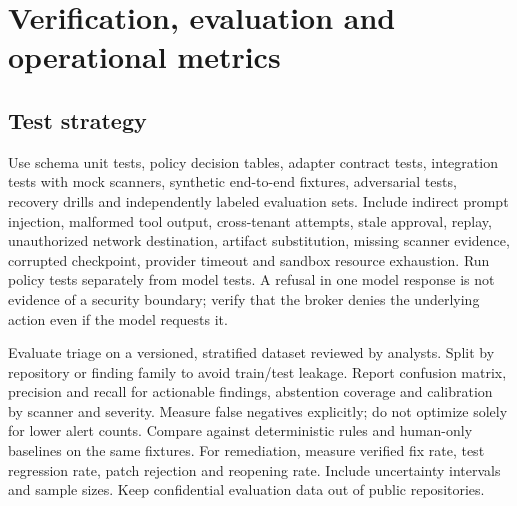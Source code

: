 \documentclass[11pt,letterpaper]{article}
\begin{document}
\section{Verification, evaluation and operational metrics}
\subsection{Test strategy}
Use schema unit tests, policy decision tables, adapter contract tests, integration tests with mock scanners, synthetic end-to-end fixtures, adversarial tests, recovery drills and independently labeled evaluation sets. Include indirect prompt injection, malformed tool output, cross-tenant attempts, stale approval, replay, unauthorized network destination, artifact substitution, missing scanner evidence, corrupted checkpoint, provider timeout and sandbox resource exhaustion. Run policy tests separately from model tests. A refusal in one model response is not evidence of a security boundary; verify that the broker denies the underlying action even if the model requests it.

Evaluate triage on a versioned, stratified dataset reviewed by analysts. Split by repository or finding family to avoid train/test leakage. Report confusion matrix, precision and recall for actionable findings, abstention coverage and calibration by scanner and severity. Measure false negatives explicitly; do not optimize solely for lower alert counts. Compare against deterministic rules and human-only baselines on the same fixtures. For remediation, measure verified fix rate, test regression rate, patch rejection and reopening rate. Include uncertainty intervals and sample sizes. Keep confidential evaluation data out of public repositories.
\end{document}

